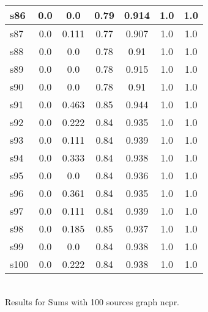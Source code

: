 \documentclass{article}
\begin{document}
\begin{tabular}{|l|c|c|c|c|c|c|}
\hline
s86 &0.0 & 0.0 & 0.79 & 0.914 & 1.0 & 1.0\\
\hline
s87 &0.0 & 0.111 & 0.77 & 0.907 & 1.0 & 1.0\\
\hline
s88 &0.0 & 0.0 & 0.78 & 0.91 & 1.0 & 1.0\\
\hline
s89 &0.0 & 0.0 & 0.78 & 0.915 & 1.0 & 1.0\\
\hline
s90 &0.0 & 0.0 & 0.78 & 0.91 & 1.0 & 1.0\\
\hline
s91 &0.0 & 0.463 & 0.85 & 0.944 & 1.0 & 1.0\\
\hline
s92 &0.0 & 0.222 & 0.84 & 0.935 & 1.0 & 1.0\\
\hline
s93 &0.0 & 0.111 & 0.84 & 0.939 & 1.0 & 1.0\\
\hline
s94 &0.0 & 0.333 & 0.84 & 0.938 & 1.0 & 1.0\\
\hline
s95 &0.0 & 0.0 & 0.84 & 0.936 & 1.0 & 1.0\\
\hline
s96 &0.0 & 0.361 & 0.84 & 0.935 & 1.0 & 1.0\\
\hline
s97 &0.0 & 0.111 & 0.84 & 0.939 & 1.0 & 1.0\\
\hline
s98 &0.0 & 0.185 & 0.85 & 0.937 & 1.0 & 1.0\\
\hline
s99 &0.0 & 0.0 & 0.84 & 0.938 & 1.0 & 1.0\\
\hline
s100 &0.0 & 0.222 & 0.84 & 0.938 & 1.0 & 1.0\\
\hline
\end{tabular}\\

\noindent Results for Sums with 100 sources graph ncpr.
\end{document}
